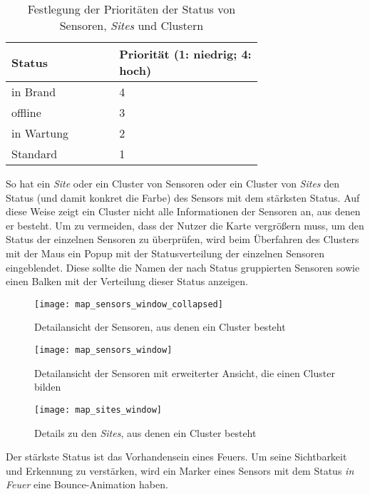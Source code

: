 \begin{table}[H]
  \begin{tabular}{p{0.3\linewidth}|p{0.4\linewidth}}
    \centering
    Status     & Priorität (1: niedrig; 4: hoch) \\ \hline\hline

    in Brand   & 4                               \\\hline
    offline    & 3                               \\\hline
    in Wartung & 2                               \\\hline
    Standard   & 1
  \end{tabular}
  \caption{Festlegung der Prioritäten der Status von Sensoren, \textit{Sites} und Clustern}
\end{table}

So hat ein \textit{Site} oder ein Cluster von Sensoren oder ein Cluster von \textit{Sites} den Status (und damit konkret die Farbe) des Sensors mit dem stärksten Status.
Auf diese Weise zeigt ein Cluster nicht alle Informationen der Sensoren an, aus denen er besteht.
Um zu vermeiden, dass der Nutzer die Karte vergrößern muss, um den Status der einzelnen Sensoren zu überprüfen, wird beim Überfahren des Clusters mit der Maus ein Popup mit der Statusverteilung der einzelnen Sensoren eingeblendet.
Diese sollte die Namen der nach Status gruppierten Sensoren sowie einen Balken mit der Verteilung dieser Status anzeigen.

\begin{figure}[H]
  \centering
  \texttt{[image: map\_sensors\_window\_collapsed]}
  \caption{Detailansicht der Sensoren, aus denen ein Cluster besteht}
  \label{fig:map_sensors_window_collapsed}
\end{figure}
\begin{figure}[H]
  \centering
  \texttt{[image: map\_sensors\_window]}
  \caption{Detailansicht der Sensoren mit erweiterter Ansicht, die einen Cluster bilden}
  \label{fig:map_sensors_window}
\end{figure}
\begin{figure}[H]
  \centering
  \texttt{[image: map\_sites\_window]}
  \caption{Details zu den \textit{Sites}, aus denen ein Cluster besteht}
  \label{fig:map_sites_window}
\end{figure}

Der stärkste Status ist das Vorhandensein eines Feuers.
Um seine Sichtbarkeit und Erkennung zu verstärken, wird ein Marker eines Sensors mit dem Status \textit{in Feuer} eine Bounce-Animation haben.



